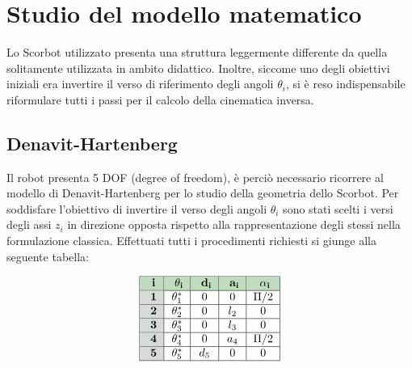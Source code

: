 \documentclass[a4paper]{article}
\begin{document}
    
    \section{Studio del modello matematico}
    
    \begin{text}
        Lo Scorbot utilizzato presenta una struttura leggermente differente da quella solitamente utilizzata in ambito didattico. Inoltre, siccome uno degli obiettivi iniziali era invertire il verso di riferimento degli angoli $\theta_i$, si è reso indispensabile riformulare tutti i passi per il calcolo della cinematica inversa.
    \end{text}
    
    \subsection{Denavit-Hartenberg}
    
    \begin{text}
        Il robot presenta 5 DOF (degree of freedom), è perciò necessario ricorrere al modello di Denavit-Hartenberg per lo studio della geometria dello Scorbot. Per soddisfare l'obiettivo di invertire il verso degli angoli $\theta_i$ sono stati scelti i versi degli assi $z_i$ in direzione opposta rispetto alla rappresentazione degli stessi nella formulazione classica. Effettuati tutti i procedimenti richiesti si giunge alla seguente tabella:\\
    \end{text}
    
    \[
    \begin{tabular}{|c|c|c|c|c|}
        \hline
            \cellcolor{cell_color1} \textbf{i} & \cellcolor{cell_color1} $\mathbf{\theta_i}$ & \cellcolor{cell_color1} $\mathbf{d_i}$ & \cellcolor{cell_color1} $\mathbf{a_i}$ & \cellcolor{cell_color1} $\mathbf{\alpha_i}$\\
        \hline
            \cellcolor{cell_color2} \textbf{1} & $\theta_1^*$ & 0 & 0 & $\Pi/2$\\
        \hline
            \cellcolor{cell_color2} \textbf{2} & $\theta_2^*$ & 0 & $l_2$ & 0\\
        \hline
            \cellcolor{cell_color2} \textbf{3} & $\theta_3^*$ & 0 & $l_3$ & 0\\
        \hline
            \cellcolor{cell_color2} \textbf{4} & $\theta_4^*$ & 0 & $a_4$ & $\Pi/2$\\
        \hline
            \cellcolor{cell_color2} \textbf{5} & $\theta_5^*$ & $d_5$ & 0 & 0\\
        \hline
    \end{tabular}
    \]
    \\
    
\end{document}
